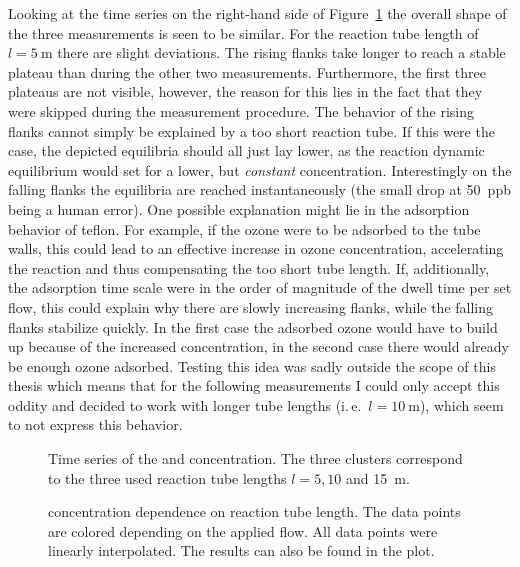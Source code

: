 Looking at the  time series on the right-hand side of
Figure~\ref{fig:ts} the overall shape of the three measurements is
seen to be similar. For the reaction tube length of
$l= \SI{5}{\meter}$ there are slight deviations. The rising flanks
take longer to reach a stable plateau than during the other two
measurements. Furthermore, the first three plateaus are not visible,
however, the reason for this lies in the fact that they were skipped
during the measurement procedure. The behavior of the rising flanks
cannot simply be explained by a too short reaction tube. If this were
the case, the depicted equilibria should all just lay lower, as the
reaction dynamic equilibrium would set for a lower, but
\emph{constant}  concentration. Interestingly on the falling
flanks the equilibria are reached instantaneously (the small drop at
\SI{50}{ppb} being a human error). One possible explanation might lie
in the adsorption behavior of teflon. For example, if the ozone were
to be adsorbed to the tube walls, this could lead to an effective
increase in ozone concentration, accelerating the reaction and thus
compensating the too short tube length. If, additionally, the
adsorption time scale were in the order of magnitude of the dwell time
per set flow, this could explain why there are slowly increasing
flanks, while the falling flanks stabilize quickly. In the first case
the adsorbed ozone would have to build up because of the increased
concentration, in the second case there would already be enough ozone
adsorbed. Testing this idea was sadly outside the scope of this thesis
which means that for the following measurements I could only accept
this oddity and decided to work with longer tube lengths
(i.\,e.~$l = \SI{10}{\meter}$), which seem to not express this
behavior.
\begin{figure}[htbp]
  \centering
  
  \hfill
  
  \caption{Time series of the  and  concentration. The
    three clusters correspond to the three used reaction tube lengths
    $l = 5, 10$ and \SI{15}{\meter}.}
  \label{fig:ts}
\end{figure}
\begin{figure}[htbp]
  \centering
  
  \caption{ concentration dependence on reaction tube
    length. The data points are colored depending on the applied
     flow. All data points were linearly interpolated. The
    results can also be found in the plot.}
  \label{fig:no-length}
\end{figure}

